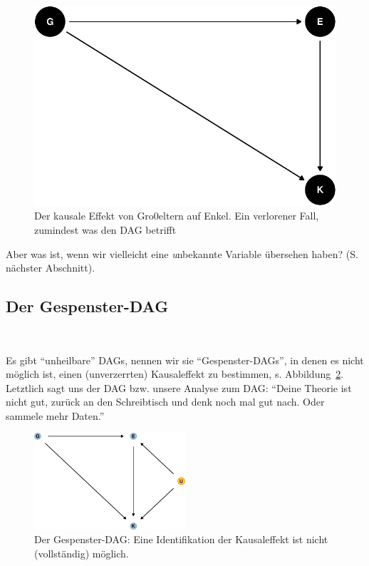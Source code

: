 \documentclass[
  a4paper,
  DIV=11]{scrreprt}
\theoremstyle{definition}
\theoremstyle{remark}
\begin{document}
\begin{figure}

{\centering \includegraphics{./kausal_files/figure-pdf/fig-dag-grannies-1.pdf}

}

\caption{\label{fig-dag-grannies}Der kausale Effekt von Gro0eltern auf
Enkel. Ein verlorener Fall, zumindest was den DAG betrifft}

\end{figure}

Aber was ist, wenn wir vielleicht eine \emph{u}nbekannte Variable
übersehen haben? (S. nächster Abschnitt). 👻

\hypertarget{der-gespenster-dag}{%
\subsection{Der Gespenster-DAG}\label{der-gespenster-dag}}

👻

Es gibt ``unheilbare'' DAGs, nennen wir sie ``Gespenster-DAGs'', in
denen es nicht möglich ist, einen (unverzerrten) Kausaleffekt zu
bestimmen, s. Abbildung~\ref{fig-dag-ghost}. Letztlich sagt uns der DAG
bzw. unsere Analyse zum DAG: ``Deine Theorie ist nicht gut, zurück an
den Schreibtisch und denk noch mal gut nach. Oder sammele mehr Daten.''

\begin{figure}

{\centering \includegraphics[width=0.5\textwidth,height=\textheight]{./kausal_files/figure-pdf/fig-dag-ghost-1.pdf}

}

\caption{\label{fig-dag-ghost}Der Gespenster-DAG: Eine Identifikation
der Kausaleffekt ist nicht (vollständig) möglich.}

\end{figure}
\end{document}
